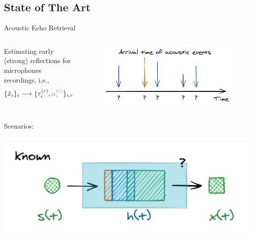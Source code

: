 \subsection*{State of The Art}

\begin{frame}[t]{Acoustic Echo Retrieval \hfill\faBook}
    \begin{columns}[T,onlytextwidth]
            Estimating early (strong) reflections for microphones recordings, i.e.,
            \begin{equation*}
                \{\contMic_i\}_i \longrightarrow \{ \tauir, \textcolor{gray}{\ampir} \}_{i,r}
            \end{equation*}
            \begin{figure}
                \centering
                \includegraphics[width=\textwidth]{./figures/arrivals.png}
            \end{figure}
    \end{columns}

    \begin{block}{Scenarios:}
    \begin{columns}[onlytextwidth]
        \centering
        \includegraphics[width=.9\textwidth]{./figures/active.png}


\end{columns}
\end{block}
\end{frame}
